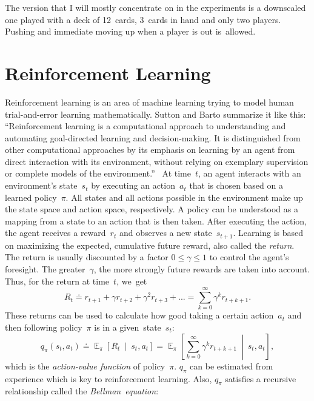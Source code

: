\documentclass[a4paper,titlepage]{article}
\DeclareMathOperator{\Expectation}{\mathbb{E}}
\newcommand{\Exp}[3]{\Expectation_{#1} \left[ #2 \ \middle| \ #3 \right]}
\begin{document}
The version that I will mostly concentrate on in the experiments is a downscaled one played with a deck of 12~cards, 3~cards in hand and only two players.
Pushing and immediate moving up when a player is out is~allowed.

\newpage

\section{Reinforcement Learning}

Reinforcement learning is an area of machine learning trying to model human trial-and-error learning mathematically. Sutton and Barto summarize it like this: ``Reinforcement learning is a computational approach to understanding and automating goal-directed learning and decision-making. It is distinguished from other computational approaches by its emphasis on learning by an agent from direct interaction with its environment, without relying on exemplary supervision or complete models of the environment.''~\cite[p.~15]{book} At time~$t$, an agent interacts with an environment's state~$s_t$ by executing an action~$a_t$ that is chosen based on a learned policy~$\pi$. All states and all actions possible in the environment make up the state space and action space, respectively. A policy can be understood as a mapping from a state to an action that is then taken. After executing the action, the agent receives a reward~$r_t$ and observes a new state~$s_{t+1}$. Learning is based on maximizing the expected, cumulative future reward, also called the \emph{return}. The return is usually discounted by a factor $0 \leq \gamma \leq 1$ to control the agent's foresight. The greater~$\gamma$, the more strongly future rewards are taken into account. Thus, for the return at time~$t$, we~get
\begin{equation*}
  R_t \doteq r_{t+1} + \gamma r_{t+2} + \gamma^2 r_{t+3} + ... = \sum_{k = 0}^{\infty} \gamma^k r_{t+k+1}.
\end{equation*}
These returns can be used to calculate how good taking a certain action~$a_t$ and then following policy~$\pi$ is in a given~state~$s_t$:
\begin{equation*}
  q_\pi(s_t, a_t) \doteq \Exp{\pi}{R_t}{s_t, a_t} = \Exp{\pi}{\sum_{k = 0}^{\infty} \gamma^k r_{t+k+1}}{s_t, a_t},
\end{equation*}
which is the \emph{action-value function} of policy~$\pi$.
$q_\pi$ can be estimated from experience which is key to reinforcement learning.
Also, $q_\pi$ satisfies a recursive relationship called the \emph{Bellman~equation}:
\end{document}
